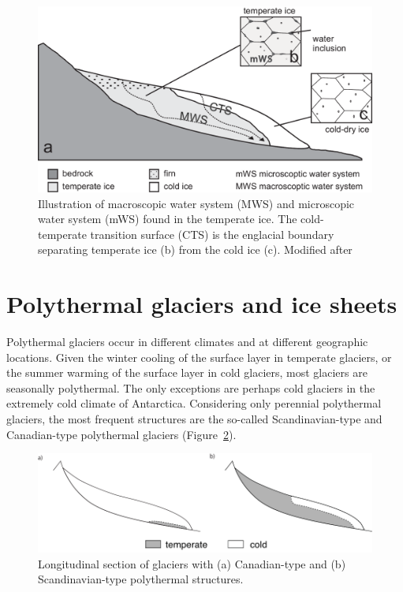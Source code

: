 \documentclass[parskip=half]{scrartcl}
\begin{document}
 \begin{figure}[tbhp] \centering
  \includegraphics[width=12.cm]{figures/mws}
  \caption{Illustration of macroscopic water system (MWS) and
microscopic water system (mWS) found in the temperate ice. The
cold-temperate transition surface (CTS) is the englacial boundary
separating temperate ice (b) from the cold ice (c). Modified after
\cite{Gusmeroli2010}}
  \label{fig:mws}
\end{figure}


\section{Polythermal glaciers and ice sheets}
\label{sec:polythermal-glaciers}

Polythermal glaciers occur in different climates and at different
geographic locations. Given the winter cooling of the surface layer in
temperate glaciers, or the summer warming of the surface layer in cold
glaciers, most glaciers are seasonally polythermal. The only
exceptions are perhaps cold glaciers in the extremely cold climate of
Antarctica. Considering only perennial polythermal glaciers, the most
frequent structures are the so-called Scandinavian-type and
Canadian-type polythermal glaciers
(Figure~\ref{fig:thermal-structures}).

\begin{figure}
  \begin{centering}
  \includegraphics[width=\textwidth]{figures/CTSstructures-2land}
  \caption{Longitudinal section of glaciers with (a) Canadian-type and
(b) Scandinavian-type polythermal structures.}
  \label{fig:thermal-structures}
  \end{centering}
\end{figure}
\end{document}
